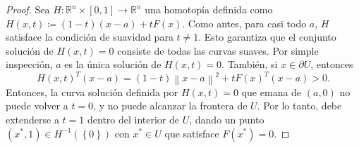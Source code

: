 \begin{frame}
	\begin{proof}
		Sea
		\begin{math}
			H\colon
			\mathbb{R}^{n}\times\left[0,1\right]\to
			\mathbb{R}^{n}
		\end{math}
		una homotopía definida como
		\begin{math}
			H\left(x,t\right)\coloneqq
			\left(1-t\right)\left(x-a\right)+
			tF\left(x\right).
		\end{math}
		Como antes, para casi todo $a$, $H$ satisface la condición de
		suavidad para $t\neq 1$.
		Esto garantiza que el conjunto solución de $H\left(x,t\right)=0$
		consiste de todas las curvas suaves.
		Por simple inspección, $a$ es la única solución de $H\left(x,t\right)=0$.
		También, si $x\in\partial U$, entonces
		\begin{equation*}
			{H\left(x,t\right)}^{T}\left(x-a\right)=
			\left(1-t\right){\left\|x-a\right\|}^{2}+
			t{F\left(x\right)}^{T}\left(x-a\right)>0.
		\end{equation*}
		Entonces, la curva solución definida por $H\left(x,t\right)=0$
		que emana de $\left(a,0\right)$ no puede volver a $t=0$, y no
		puede alcanzar la frontera de $U$.
		Por lo tanto, debe extenderse a $t=1$ dentro del interior de $U$,
		dando un punto
		\begin{math}
			\left(x^{\ast},1\right)\in
			H^{-1}\left(\left\{0\right\}\right)
		\end{math}
		con $x^{\ast}\in U$ que satisface $F\left(x^{\ast}\right)=0$.
	\end{proof}
\end{frame}

